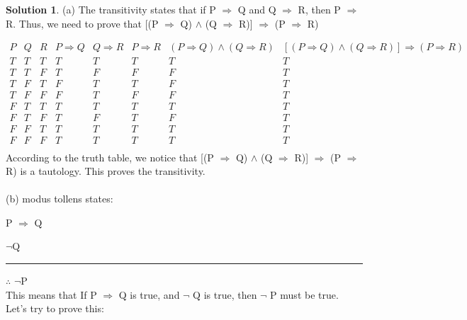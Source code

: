 \documentclass{article}
\theoremstyle{definition}
\newtheorem*{solution}{Solution}
\begin{document}
\begin{solution}

(a) The transitivity states that if P \(\Rightarrow\) Q and Q \(\Rightarrow\) R, then P \(\Rightarrow\) R. Thus, we need to prove that [(P \(\Rightarrow\) Q) \(\wedge\) (Q \(\Rightarrow\) R)] \(\Rightarrow\) (P \(\Rightarrow\) R)

\begin{displaymath}
\begin{array}{ c|c|c|c|c|c|c|c }
P & Q & R & P \Rightarrow Q & Q \Rightarrow R & P \Rightarrow R &  (P \Rightarrow Q) \wedge (Q \Rightarrow R) &  [(P \Rightarrow Q) \wedge (Q \Rightarrow R)] \Rightarrow (P \Rightarrow R)  \\ %
\hline %
T & T & T & T & T & T & T & T\\
T & T & F & T & F & F & F & T\\
T & F & T & F & T & T & F & T\\
T & F & F & F & T & F & F & T\\
F & T & T & T & T & T & T & T\\
F & T & F & T & F & T & F & T\\
F & F & T & T & T & T & T & T\\
F & F & F & T & T & T & T & T\\
\end{array}
\end{displaymath}
According to the truth table, we notice that [(P \(\Rightarrow\) Q) \(\wedge\) (Q \(\Rightarrow\) R)] \(\Rightarrow\) (P \(\Rightarrow\) R) is a tautology. This proves the transitivity.\\\\
(b) modus tollens states:

	P \(\Rightarrow\) Q
	
	\(\neg\)Q
	
	\noindent\rule{2cm}{0.4pt}
	
	\(\therefore\) \(\neg\)P\\
	
	
	This means that If P \(\Rightarrow\) Q is true, and \(\neg\) Q is true, then \(\neg\) P must be true. Let's try to prove this:
	

\end{solution}
\end{document}
